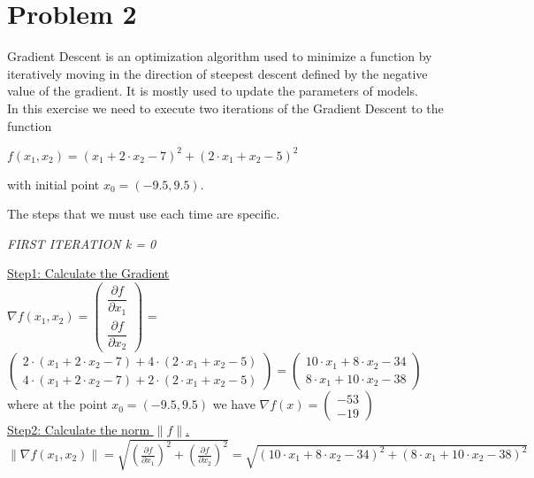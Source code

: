 
\section{Problem 2}
Gradient Descent is an optimization algorithm used to minimize a function by iteratively moving in the direction of steepest descent defined by the negative value of the gradient. It is mostly used to update the parameters of models.\\
In this exercise we need to execute two iterations of the Gradient Descent to the function
\begin{center}
$	f(x_1,x_2) = (x_1+2 \cdot x_2 - 7)^2 + (2 \cdot x_1 + x_2 -5)^2$
\end{center}
with initial point $x_0 = (-9.5,9.5)$.

The steps that we must use each time are specific.
\begin{center}
	\textit{FIRST ITERATION k = 0}
\end{center}

\underline{Step1: Calculate the Gradient}\\

\(\nabla f(x_1,x_2) = \left(\begin{array}{c}
	\dfrac{\partial f}{\partial x_1} \\[4mm]
	\dfrac{\partial f}{\partial x_2}
\end{array}\right)\) = $\left(\begin{array}{c}
 2 \cdot (x_1 + 2 \cdot x_2 - 7) + 4 \cdot (2 \cdot x_1 + x_2 -5)\\[1mm]
4 \cdot (x_1 + 2 \cdot x_2 -7) + 2 \cdot (2 \cdot x_1 + x_2 - 5)
\end{array}\right) = \left(\begin{array}{c}
10 \cdot x_1 + 8 \cdot x_2 - 34\\[1mm]
8 \cdot x_1 + 10 \cdot x_2 -38
\end{array}\right)$ \\[3mm]

where at the point $x_0 = (-9.5,9.5)$ we have $\nabla f(x) = \left(\begin{array}{c}
	-53 \\
	-19
\end{array}\right)$
\\[4mm]

\underline{Step2: Calculate the norm \(\|f\|\).}\\

\(\|\nabla f(x_1,x_2)\| = \sqrt{\left(\frac{\partial f}{\partial x_1}\right)^2 + \left(\frac{\partial f}{\partial x_2}\right)^2} = \sqrt{\left(10 \cdot x_1 + 8 \cdot x_2 - 34\right)^2 + \left(8 \cdot x_1 + 10 \cdot x_2 -38\right)^2}\) \\[2mm]

